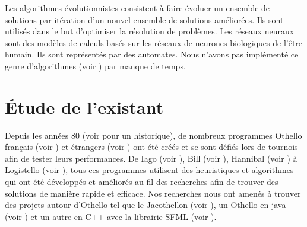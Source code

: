 Les algorithmes évolutionnistes consistent à faire évoluer un ensemble de solutions par itération d’un nouvel ensemble de solutions améliorées. Ils sont utilisés dans le but d’optimiser la résolution de problèmes.
Les réseaux neuraux sont des modèles de calculs basés sur les réseaux de neurones biologiques de l’être humain. Ils sont représentés par des automates. Nous n'avons pas implémenté ce genre d'algorithmes (voir \cite{b}) par manque de temps. 


\section{Étude de l'existant}

Depuis les années 80 (voir \cite{antho,otstory} pour un historique), de nombreux programmes Othello français (voir \cite{prog1}) et
étrangers (voir \cite{prog2}) ont été créés et se sont défiés lors de tournois afin de
tester leurs performances. De Iago (voir \cite{iago}), Bill (voir \cite{bill}), Hannibal (voir \cite{hannibal}) à Logistello (voir \cite{logistello}), tous ces programmes utilisent des heuristiques et algorithmes qui ont été développés et améliorés au fil des recherches afin de trouver des solutions de manière rapide et efficace. Nos recherches nous ont amenés à trouver des projets autour d'Othello tel que le Jacothellon (voir \cite{jacothellon}), un Othello en java (voir \cite{projothello1}) et un autre en C++ avec la librairie SFML (voir \cite{projothello2}).

